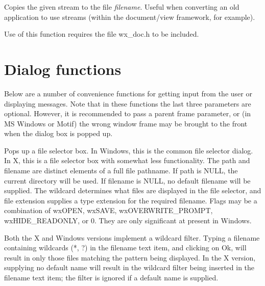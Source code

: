 \label{wxtransferstreamtofile}


Copies the given stream to the file {\it filename}. Useful when converting an old application to
use streams (within the document/view framework, for example).

Use of this function requires the file wx\_doc.h to be included.

\section{Dialog functions}\label{dialogfunctions}

Below are a number of convenience functions for getting input from the
user or displaying messages. Note that in these functions the last three
parameters are optional. However, it is recommended to pass a parent frame
parameter, or (in MS Windows or Motif) the wrong window frame may be brought to
the front when the dialog box is popped up.

\label{wxfileselector}


Pops up a file selector box. In Windows, this is the common file selector
dialog. In X, this is a file selector box with somewhat less functionality.
The path and filename are distinct elements of a full file pathname.
If path is NULL, the current directory will be used. If filename is NULL,
no default filename will be supplied. The wildcard determines what files
are displayed in the file selector, and file extension supplies a type
extension for the required filename. Flags may be a combination of wxOPEN,
wxSAVE, wxOVERWRITE\_PROMPT, wxHIDE\_READONLY, or 0. They are only significant
at present in Windows.

Both the X and Windows versions implement a wildcard filter. Typing a
filename containing wildcards (*, ?) in the filename text item, and
clicking on Ok, will result in only those files matching the pattern being
displayed. In the X version, supplying no default name will result in the
wildcard filter being inserted in the filename text item; the filter is
ignored if a default name is supplied.

